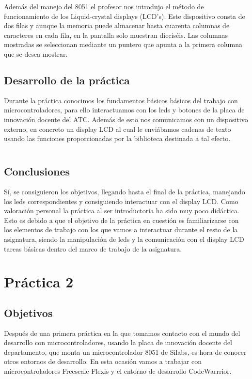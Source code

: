 \documentclass[a4paper, 11pt]{article}
\begin{document}
Además del manejo del 8051 el profesor nos introdujo el método de
funcionamiento de los Liquid-crystal displays (LCD's).  Este
dispositivo consta de dos filas y aunque la memoria puede almacenar
hasta cuarenta columnas de caracteres en cada fila, en la pantalla
solo muestran dieciséis. Las columnas mostradas se seleccionan
mediante un puntero que apunta a la primera columna que se desea
mostrar.

\subsection{Desarrollo de la práctica}
Durante la práctica conocimos los fundamentos básicos básicos del
trabajo con microcontroladores, para ello interactuamos con los
leds y botones de la placa de innovación docente del ATC.  Además
de esto nos comunicamos con un dispositivo externo, en concreto un
display LCD al cual le enviábamos cadenas de texto usando las
funciones proporcionadas por la biblioteca destinada a tal efecto.
\inputminted[tabsize=4, fontsize=\small]{c}{prac1-main.c}

\subsection{Conclusiones}
Sí, se consiguieron los objetivos, llegando hasta el final de
la práctica, manejando los leds correspondientes y consiguiendo
interactuar con el display LCD. Como valoración personal la
práctica al ser introductoria ha sido muy poco didáctica. Esto
es debido a que el objetivo de la práctica en cuestión es
familiarizarse con los elementos de trabajo con los que vamos a
interactuar durante el resto de la asignatura, siendo la
manipulación de leds y la comunicación con el display LCD
tareas básicas dentro del marco de trabajo de la asignatura.

\section{Práctica 2}

\subsection{Objetivos}
Después de una primera práctica en la que tomamos contacto con el
mundo del desarrollo con microcontroladores, usando la placa de
innovación docente del departamento, que monta un microcontrolador
8051 de Silabs, es hora de conocer otros entornos de desarrollo. En
esta ocasión vamos a trabajar con microcontroladores Freescale
Flexis y el entorno de desarrollo CodeWarrrior.
\end{document}
